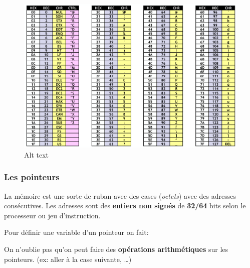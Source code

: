 \begin{figure}
\centering
\includegraphics{image-6.png}
\caption{Alt text}
\end{figure}

\subsubsection{Les pointeurs}\label{les-pointeurs}

La mémoire est une sorte de ruban avec des cases (\emph{octets}) avec
des adresses consécutives. Les adresses sont des \textbf{entiers non
signés} de \textbf{32/64} bits selon le processeur ou jeu d'instruction.

Pour définir une variable d'un pointeur on fait:

\begin{Shaded}
\begin{Highlighting}[]
\OperatorTok{*}\OperatorTok{;} 
\OperatorTok{\&}\OperatorTok{;} 
\OperatorTok{*}\OperatorTok{;} 
\end{Highlighting}
\end{Shaded}

On n'oublie pas qu'on peut faire des \textbf{opérations arithmétiques}
sur les pointeurs. (ex: aller à la case suivante, \ldots)


